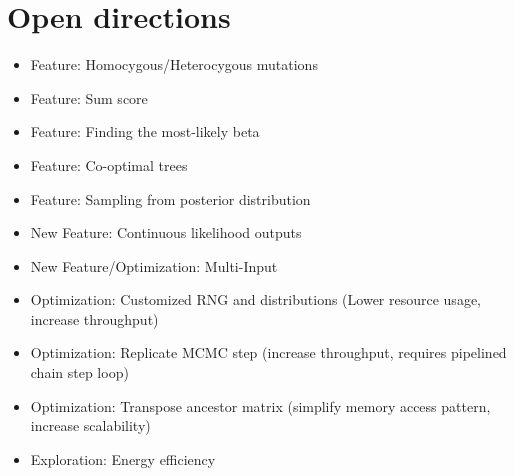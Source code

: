 \section{Open directions}
\label{sec:open_directions}


\begin{itemize}
    \item Feature: Homocygous/Heterocygous mutations
    \item Feature: Sum score
    \item Feature: Finding the most-likely beta
    \item Feature: Co-optimal trees
    \item Feature: Sampling from posterior distribution
    \item New Feature: Continuous likelihood outputs
    \item New Feature/Optimization: Multi-Input
    \item Optimization: Customized RNG and distributions (Lower resource usage, increase throughput)
    \item Optimization: Replicate MCMC step (increase throughput, requires pipelined chain step loop)
    \item Optimization: Transpose ancestor matrix (simplify memory access pattern, increase scalability)
    \item Exploration: Energy efficiency
\end{itemize}